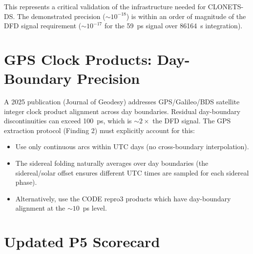 \documentclass[11pt,a4paper]{article}
\begin{document}
This represents a critical validation of the infrastructure needed
for CLONETS-DS. The demonstrated precision ($\sim 10^{-18}$) is
within an order of magnitude of the DFD signal requirement
($\sim 10^{-17}$ for the 59~ps signal over 86164~s integration).

\section{GPS Clock Products: Day-Boundary Precision}
\label{sec:GPS-clocks}

A 2025 publication (Journal of Geodesy) addresses GPS/Galileo/BDS
satellite integer clock product alignment across day boundaries.
Residual day-boundary discontinuities can exceed 100~ps, which is
$\sim 2\times$ the DFD signal. The GPS extraction protocol
(Finding 2) must explicitly account for this:
\begin{itemize}[nosep]
\item Use only continuous arcs within UTC days (no cross-boundary
  interpolation).
\item The sidereal folding naturally averages over day boundaries
  (the sidereal/solar offset ensures different UTC times are sampled
  for each sidereal phase).
\item Alternatively, use the CODE repro3 products which have
  day-boundary alignment at the $\sim 10$~ps level.
\end{itemize}


\section*{Updated P5 Scorecard}
\end{document}
